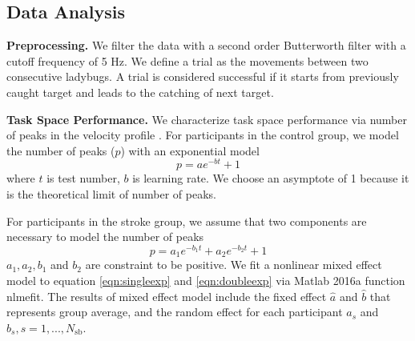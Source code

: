 \subsection{Data Analysis}

\textbf{Preprocessing.}
We filter the data with a second order Butterworth filter with a cutoff frequency of 5 Hz.
We define a trial as the movements between two consecutive ladybugs.
A trial is considered successful if it starts from previously caught target and leads to the catching of next target.

\textbf{Task Space Performance.}
We characterize task space performance via number of peaks in the velocity profile \cite{}.
For participants in the control group, we model the number of peaks ($ p $) with an exponential model
\begin{equation}\label{eqn:singleexp}
p = a e^{-b t} + 1
\end{equation}
where $ t $ is test number, $ b $ is learning rate.
We choose an asymptote of 1 because it is the theoretical limit of number of peaks.

For participants in the stroke group, we assume that two components are necessary to model the number of peaks
\begin{equation}\label{eqn:doubleexp}
p = a_1 e^{-b_1 t} + a_2 e^{-b_2 t} + 1
\end{equation}
$ a_1, a_2, b_1 $ and $ b_2 $ are constraint to be positive.
We fit a nonlinear mixed effect model \cite{} to equation \ref{eqn:singleexp} and \ref{eqn:doubleexp} via Matlab 2016a function \textsf{nlmefit}.
The results of mixed effect model include the fixed effect $ \hat{a} $ and $ \hat{b} $ that represents group average, and the random effect for each participant $ a_s $ and $ b_s, s = 1, ..., N_\text{sb} $.

